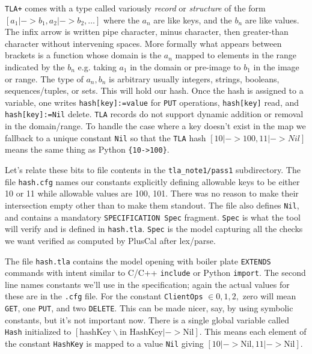 \documentclass[twocolumn]{article}
\begin{document}
\texttt{TLA+} comes with a type called variously \emph{record} or \emph{structure} of the form $[a_1 | -> b_1, a_2 | -> b_2, \ldots]$ where the $a_n$ are like keys, and the $b_n$ are like values. The infix arrow is written pipe character, minus character, then greater-than character without intervening spaces. More formally what appears between brackets is a function whose domain is the $a_n$ mapped to elements in the range indicated by the $b_n$ e.g. taking $a_1$ in the domain or pre-image to $b_1$ in the image or range. The type of $a_n, b_n$ is arbitrary usually integers, strings, booleans, sequences/tuples, or sets. This will hold our hash. Once the hash is assigned to a variable, one writes \texttt{hash[key]:=value} for \texttt{PUT} operations, \texttt{hash[key]} read, and \texttt{hash[key]:=Nil} delete. \texttt{TLA} records do not support dynamic addition or removal in the domain/range. To handle the case where a key doesn't exist in the map we fallback to a unique constant \texttt{Nil} so that the \texttt{TLA} hash $[10 | -> 100, 11 | -> Nil]$ means the same thing as Python \texttt{\{10->100\}}.
 
Let's relate these bits to file contents in the \texttt{tla\_note1/pass1} subdirectory. The file \texttt{hash.cfg} names our constants explicitly defining allowable keys to be either 10 or 11 while allowable values are 100, 101. There was no reason to make their intersection empty other than to make them standout. The file also defines \texttt{Nil}, and contains a mandatory \texttt{SPECIFICATION Spec} fragment. \texttt{Spec} is what the tool will verify and is defined in \texttt{hash.tla}. \texttt{Spec} is the model capturing all the checks we want verified as computed by PlusCal after lex/parse.

The file \texttt{hash.tla} contains the model opening with boiler plate \texttt{EXTENDS} commands with intent similar to C/C++ \texttt{include} or Python \texttt{import}. The second line names constants we'll use in the specification; again the actual values for these are in the \texttt{.cfg} file. For the constant \texttt{ClientOps} $\in {0,1,2,}$ zero will mean \texttt{GET}, one \texttt{PUT}, and two \texttt{DELETE}. This can be made nicer, say, by using symbolic constants, but it's not important now. There is a single global variable called \texttt{Hash} initialized to $[\text{hashKey} \backslash \text{in HashKey} |-> \text{Nil}]$. This means each element of the constant \texttt{HashKey} is mapped to a value \texttt{Nil} giving $[10 |-> \text{Nil}, 11 |-> \text{Nil}]$.
\end{document}
